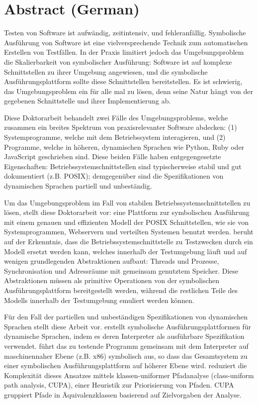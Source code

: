 \chapter*{Abstract (German)}

Testen von Software ist aufwändig, zeitintensiv, und fehleranfällig. Symbolische Ausführung von Software ist eine vielversprechende Technik zum automatischen Erstellen von Testfällen. In der Praxis limitiert jedoch das Umgebungsproblem die Skalierbarkeit von symbolischer Ausführung: Software ist auf komplexe Schnittstellen zu ihrer Umgebung angewiesen, und die symbolische Ausführungsplattform sollte diese Schnittstellen bereitstellen. Es ist schwierig, das Umgebungsproblem ein für alle mal zu lösen, denn seine Natur hängt von der gegebenen Schnittstelle und ihrer Implementierung ab.

Diese Doktorarbeit behandelt zwei Fälle des Umgebungsproblems, welche zusammen ein breites Spektrum von praxisrelevanter Software abdecken: (1) Systemprogramme, welche mit dem Betriebssystem interagieren, und (2) Programme, welche in höheren, dynamischen Sprachen wie Python, Ruby oder JavaScript geschrieben sind. Diese beiden Fälle haben entgegengesetzte Eigenschaften: Betriebssystemschnittstellen sind typischerweise stabil und gut dokumentiert (z.B. POSIX); demgegenüber sind die Spezifikationen von dynamischen Sprachen partiell und unbeständig.

Um das Umgebungsproblem im Fall von stabilen Betriebssystemschnittstellen zu lösen, stellt diese Doktorarbeit \emph{\cnine} vor: eine Plattform zur symbolischen Ausführung mit einem genauen und effizienten Modell der POSIX Schnittstellen, wie sie von Systemprogrammen, Webservern und verteilten Systemen benutzt werden. \cnine beruht auf der Erkenntnis, dass die Betriebssystemschnittstelle zu Testzwecken durch ein Modell ersetzt werden kann, welches innerhalb der Testumgebung läuft und auf wenigen grundlegenden Abstraktionen aufbaut: Threads und Prozesse, Synchronisation und Adressräume mit gemeinsam genutztem Speicher. Diese Abstraktionen müssen als primitive Operationen von der symbolischen Ausführungsplattform bereitgestellt werden, während die restlichen Teile des Modells innerhalb der Testumgebung emuliert werden können.

Für den Fall der partiellen und unbeständigen Spezifikationen von dynamischen Sprachen stellt diese Arbeit \emph{\chef} vor. \chef erstellt symbolische Ausführungsplattformen für dynamische Sprachen, indem es deren Interpreter als ausführbare Spezifikation verwendet. \chef führt das zu testende Programm gemeinsam mit dem Interpreter auf maschinennaher Ebene (z.B. x86) symbolisch aus, so dass das Gesamtsystem zu einer symbolischen Ausführungsplattform auf höherer Ebene wird. \chef reduziert die Komplexität dieses Ansatzes mittels klassen-uniformer Pfadanalyse (class-uniform path analysis, CUPA), einer Heuristik zur Priorisierung von Pfaden. CUPA gruppiert Pfade in Äquivalenzklassen basierend auf Zielvorgaben der Analyse. 

